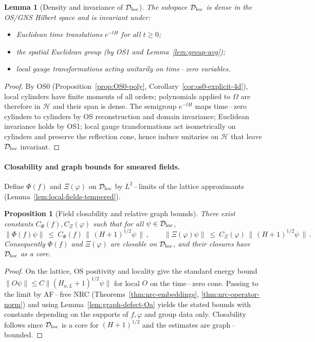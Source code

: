 \documentclass[11pt]{amsart}
\theoremstyle{plain}
\newtheorem{lemma}[theorem]{Lemma}
\newtheorem{proposition}[theorem]{Proposition}
\theoremstyle{definition}
\theoremstyle{remark}
\begin{document}
\begin{lemma}[Density and invariance of $\mathcal D_{\rm loc}$]\label{lem:field-core}
The subspace $\mathcal D_{\rm loc}$ is dense in the OS/GNS Hilbert space and is invariant under:
\begin{itemize}
  \item[(i)] Euclidean time translations $e^{-tH}$ for all $t\ge 0$;
  \item[(ii)] the spatial Euclidean group (by OS1 and Lemma~\ref{lem:group-avg});
  \item[(iii)] local gauge transformations acting unitarily on time\,–\,zero variables.
\end{itemize}
\end{lemma}
\begin{proof}
By OS0 (Proposition~\ref{prop:OS0-poly}, Corollary~\ref{cor:os0-explicit-4d}), local cylinders have finite moments of all orders; polynomials applied to $\Omega$ are therefore in $\mathcal H$ and their span is dense. The semigroup $e^{-tH}$ maps time\,–\,zero cylinders to cylinders by OS reconstruction and domain invariance; Euclidean invariance holds by OS1; local gauge transformations act isometrically on cylinders and preserve the reflection cone, hence induce unitaries on $\mathcal H$ that leave $\mathcal D_{\rm loc}$ invariant.
\end{proof}

\paragraph{Closability and graph bounds for smeared fields.}
Define $\Phi(f)$ and $\Xi(\varphi)$ on $\mathcal D_{\rm loc}$ by $L^2$\,–\,limits of the lattice approximants (Lemma~\ref{lem:local-fields-tempered}).

\begin{proposition}[Field closability and relative graph bounds]\label{prop:field-closability}
There exist constants $C_\Phi(f),C_\Xi(\varphi)$ such that for all $\psi\in \mathcal D_{\rm loc}$,
\[
  \|\Phi(f)\psi\|\ \le\ C_\Phi(f)\,\big\|\,(H+1)^{1/2}\psi\,\big\|\,,\qquad
  \|\Xi(\varphi)\psi\|\ \le\ C_\Xi(\varphi)\,\big\|\,(H+1)^{1/2}\psi\,\big\|\,.
\]
Consequently $\Phi(f)$ and $\Xi(\varphi)$ are closable on $\mathcal D_{\rm loc}$, and their closures have $\mathcal D_{\rm loc}$ as a core.
\end{proposition}
\begin{proof}
On the lattice, OS positivity and locality give the standard energy bound $\|O\psi\|\le C\|(H_{a,L}+1)^{1/2}\psi\|$ for local $O$ on the time\,–\,zero cone. Passing to the limit by AF\,–\,free NRC (Theorems~\ref{thm:nrc-embeddings}, \ref{thm:nrc-operator-norm}) and using Lemma~\ref{lem:graph-defect-Oa} yields the stated bounds with constants depending on the supports of $f,\varphi$ and group data only. Closability follows since $\mathcal D_{\rm loc}$ is a core for $(H+1)^{1/2}$ and the estimates are graph\,–\,bounded.
\end{proof}
\end{document}

